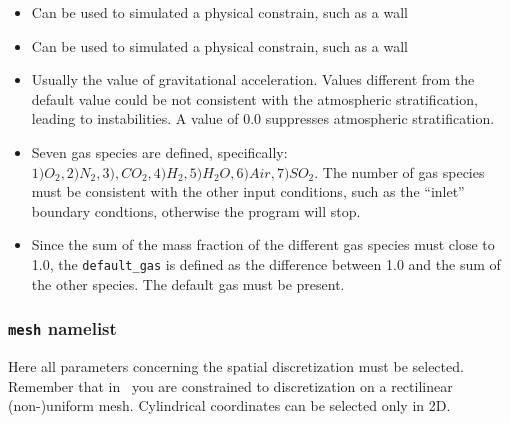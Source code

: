 \begin{itemize}
\item
{}
{Can be used to simulated a physical constrain, such as a wall}

\item
{}
{Can be used to simulated a physical constrain, such as a wall}

\item
{}
{Usually the value of gravitational acceleration. Values different
from the default value could be not consistent with the atmospheric
stratification, leading to instabilities. A value of 0.0 suppresses
atmospheric stratification}.

\item
{}
{Seven gas species are defined, specifically: \\
$ 1) O_2, 2) N_2, 3), CO_2, 4) H_2, 5) H_2O, 6) Air, 7) SO_2$. 
The number of gas species must be consistent with
the other input conditions, such as the ``inlet'' boundary condtions,
otherwise the program will stop.}

\item
{}
{Since the sum of the mass fraction of the different gas species must
close to 1.0, the {\tt default\_gas} is defined as the difference 
between 1.0 and the sum of the other species. The default gas must
be present.}

\end{itemize}

\subsubsection{{\tt mesh} namelist}
Here all parameters concerning the spatial discretization must be
selected. Remember that in \PDAC\ you are constrained to discretization 
on a rectilinear (non-)uniform mesh. Cylindrical coordinates can be
selected only in 2D.

